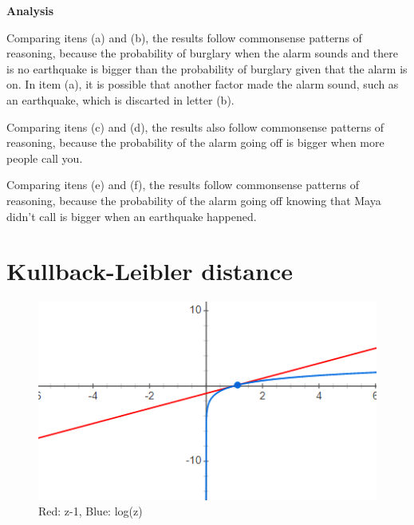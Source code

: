 \documentclass{article}
\begin{document}
\textbf{Analysis}

Comparing itens (a) and (b), the results follow commonsense patterns of reasoning, because the probability of burglary when the alarm sounds and there is no earthquake is bigger than the probability of burglary given that the alarm is on. In item (a), it is possible that another factor made the alarm sound, such as an earthquake, which is discarted in letter (b).\bigbreak

Comparing itens (c) and (d), the results also follow commonsense patterns of reasoning, because the probability of the alarm going off is bigger when more people call you.\bigbreak

Comparing itens (e) and (f), the results follow commonsense patterns of reasoning, because the probability of the alarm going off knowing that Maya didn't call is bigger when an earthquake happened.\bigbreak

\section{Kullback-Leibler distance}

\begin{figure}[h!]
  \includegraphics[scale=1]{graphic1.png}
  \centering
  \caption{Red: z-1, Blue: log(z)}
\end{figure}
\end{document}
